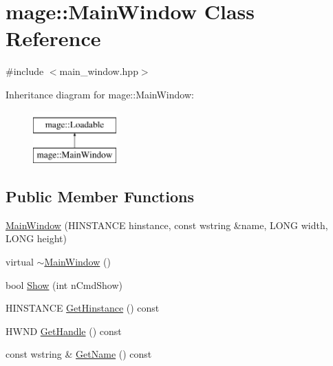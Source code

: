 \hypertarget{classmage_1_1_main_window}{}\section{mage\+:\+:Main\+Window Class Reference}
\label{classmage_1_1_main_window}


{\ttfamily \#include $<$main\+\_\+window.\+hpp$>$}

Inheritance diagram for mage\+:\+:Main\+Window\+:\begin{figure}[H]
\begin{center}
\leavevmode
\includegraphics[height=2.000000cm]{classmage_1_1_main_window}
\end{center}
\end{figure}
\subsection*{Public Member Functions}
\begin{DoxyCompactItemize}
\item 
\hyperlink{classmage_1_1_main_window_a907a5c337e0e1f14281858b7713235ab}{Main\+Window} (H\+I\+N\+S\+T\+A\+N\+CE hinstance, const wstring \&name, L\+O\+NG width, L\+O\+NG height)
\item 
virtual \hyperlink{classmage_1_1_main_window_ada7ecf97d82ce08ba2f31f0afd891031}{$\sim$\+Main\+Window} ()
\item 
bool \hyperlink{classmage_1_1_main_window_aefa6d872bbe7702f51e4a0ca62ea587f}{Show} (int n\+Cmd\+Show)
\item 
H\+I\+N\+S\+T\+A\+N\+CE \hyperlink{classmage_1_1_main_window_ae26a7e1e96bc5522461aed6156138a0c}{Get\+Hinstance} () const
\item 
H\+W\+ND \hyperlink{classmage_1_1_main_window_acfaa88503f2c5e4a05aa9fa9698d2735}{Get\+Handle} () const
\item 
const wstring \& \hyperlink{classmage_1_1_main_window_aa2b99118a5125d4effbd5c5d9352e7e0}{Get\+Name} () const
\end{DoxyCompactItemize}
